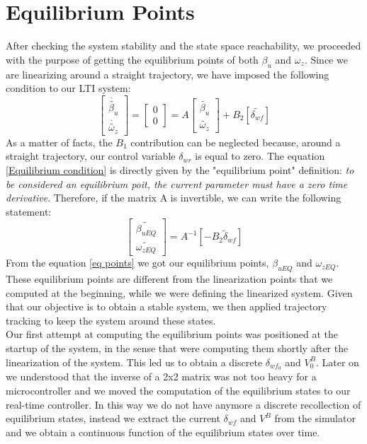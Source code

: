 	\section{Equilibrium Points}
	After checking the system stability and the state space reachability, we proceeded with the purpose of getting the equilibrium points of both $\beta_{u}$ and $\omega_{z}$. Since we are linearizing around a straight trajectory, we have imposed the following condition to our LTI system:
	\begin{equation} \label{Equilibrium condition}
	\begin{bmatrix}
	\dot{\tilde{\beta_{u}}} \\
	\dot{\tilde{\omega_{z}}}
	\end{bmatrix} =
	\begin{bmatrix}
	0 \\
	0
	\end{bmatrix} = A
	\begin{bmatrix}
	\tilde{\beta_{u}} \\
	\tilde{\omega_{z}}
	\end{bmatrix} 
	 + B_{2}[\tilde{\delta_{wf}}]
	\end{equation}
	As a matter of facts, the $B_{1}$ contribution can be neglected because, around a straight trajectory, our control variable $\delta_{wr}$ is equal to zero. The equation \ref{Equilibrium condition} is directly given by the "equilibrium point" definition: \textit{to be considered an equilibrium poit, the current parameter must have a zero time derivative}. Therefore, if the matrix A is invertible, we can write the following statement:
	\begin{equation} \label{eq points}
	\begin{bmatrix}
	\tilde{\beta_{uEQ}} \\
	\tilde{\omega_{zEQ}}
	\end{bmatrix} = 
	A^{-1}[- B_{2} \tilde\delta_{wf}]
	\end{equation}
	From the equation \ref{eq points} we got our equilibrium points, $\beta_{uEQ}$ and $\omega_{zEQ}$. These equilibrium points are different from the linearization points that we computed at the beginning, while we were defining the linearized system. Given that our objective is to obtain a stable system, we then applied trajectory tracking to keep the system around these states.\\
	Our first attempt at computing the equilibrium points was positioned at the startup of the system, in the sense that were computing them shortly after the linearization of the system. This led us to obtain a discrete $\delta_{wf_{0}}$ and $V_{0}^B$. Later on we understood that the inverse of a 2x2 matrix was not too heavy for a microcontroller and we moved the computation of the equilibrium states to our real-time controller. In this way we do not have anymore a discrete recollection of equilibrium states, instead we extract the current $\delta_{wf}$ and $V^B$ from the simulator and we obtain a continuous function of the equilibrium states over time.
